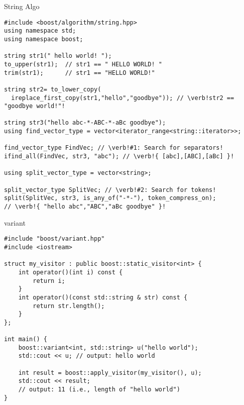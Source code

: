 \documentclass{beamer}
\begin{document}
\begin{frame}[fragile]{String Algo}
\small
\begin{lstlisting}
#include <boost/algorithm/string.hpp>
using namespace std;
using namespace boost;

string str1(" hello world! ");
to_upper(str1);  // str1 == " HELLO WORLD! "
trim(str1);      // str1 == "HELLO WORLD!"

string str2= to_lower_copy(
  ireplace_first_copy(str1,"hello","goodbye")); // \verb!str2 == "goodbye world!"!

string str3("hello abc-*-ABC-*-aBc goodbye");
using find_vector_type = vector<iterator_range<string::iterator>>;

find_vector_type FindVec; // \verb!#1: Search for separators!
ifind_all(FindVec, str3, "abc"); // \verb!{ [abc],[ABC],[aBc] }!

using split_vector_type = vector<string>;

split_vector_type SplitVec; // \verb!#2: Search for tokens!
split(SplitVec, str3, is_any_of("-*-"), token_compress_on); 
// \verb!{ "hello abc","ABC","aBc goodbye" }!
\end{lstlisting}
\end{frame}

\begin{frame}[fragile]{variant}
\small
\begin{lstlisting}
#include "boost/variant.hpp"
#include <iostream>

struct my_visitor : public boost::static_visitor<int> {
    int operator()(int i) const {
        return i;
    }
    int operator()(const std::string & str) const {
        return str.length();
    }
};

int main() {
    boost::variant<int, std::string> u("hello world");
    std::cout << u; // output: hello world

    int result = boost::apply_visitor(my_visitor(), u);
    std::cout << result; 
    // output: 11 (i.e., length of "hello world")
}
\end{lstlisting}
\end{frame}
\end{document}
